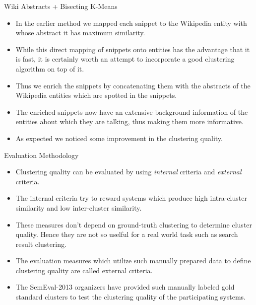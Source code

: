 \documentclass{beamer}
\begin{document}
\begin{frame}{Wiki Abstracts + Bisecting K-Means}
\begin{itemize}
\item In the earlier method we mapped each snippet to the Wikipedia
  entity with whose abstract it has maximum similarity. 
\item While this direct mapping of snippets onto entities has the
  advantage that it is fast, it is certainly worth an attempt to
  incorporate a good clustering algorithm on top of it.
\item Thus we enrich the snippets by concatenating them with the
  abstracts of the Wikipedia entities which are spotted in the
  snippets. 
\item The enriched snippets now have an extensive background
  information of the entities about which they are talking, thus
  making them more informative. 
\item As expected we noticed some improvement in the clustering
  quality.
\end{itemize}
\end{frame}

\begin{frame}{Evaluation Methodology}
\begin{itemize}
\item Clustering quality can be evaluated by using {\it internal} criteria
and {\it external} criteria. 
\item The internal criteria try to reward systems which produce high
  intra-cluster similarity and low inter-cluster similarity. 
\item These measures don't depend on ground-truth clustering to
  determine cluster quality. Hence they are not so uselful for a real
  world task such as search result clustering.
\item The evaluation measures which utilize such manually prepared
  data to define clustering quality are called external criteria. 
\item The SemEval-2013 organizers have provided such manually labeled
  gold standard clusters to test the clustering quality of the
  participating systems. 
\end{itemize}
\end{frame}
\end{document}
